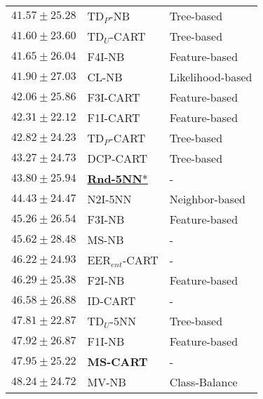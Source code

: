 \begin{tabular}{lll}
$41.57\pm25.28$ & TD$_P$-NB & Tree-based \\
$41.60\pm23.60$ & TD$_U$-CART & Tree-based \\
$41.65\pm26.04$ & F4I-NB & Feature-based \\
$41.90\pm27.03$ & CL-NB & Likelihood-based \\
$42.06\pm25.86$ & F3I-CART & Feature-based \\
$42.31\pm22.12$ & F1I-CART & Feature-based \\
$42.82\pm24.23$ & TD$_P$-CART & Tree-based \\
$43.27\pm24.73$ & DCP-CART & Tree-based \\
$43.80\pm25.94$ & \underline{\textbf{Rnd-5NN}*} & - \\
$44.43\pm24.47$ & N2I-5NN & Neighbor-based \\
$45.26\pm26.54$ & F3I-NB & Feature-based \\
$45.62\pm28.48$ & MS-NB & - \\
$46.22\pm24.93$ & EER$_{ent}$-CART & - \\
$46.29\pm25.38$ & F2I-NB & Feature-based \\
$46.58\pm26.88$ & ID-CART & - \\
$47.81\pm22.87$ & TD$_U$-5NN & Tree-based \\
$47.92\pm26.87$ & F1I-NB & Feature-based \\
$47.95\pm25.22$ & \textbf{MS-CART} & - \\
$48.24\pm24.72$ & MV-NB & Class-Balance \\
\bottomrule
\end{tabular}
